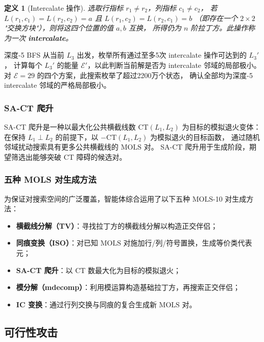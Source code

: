 \documentclass[11pt,a4paper]{ctexart}
\newtheorem{definition}[theorem]{定义}
\theoremstyle{remark}
\newcommand{\CT}{\mathrm{CT}}
\newcommand{\E}{\mathcal{E}}
\newcommand{\MOLS}{\mathrm{MOLS}}
\begin{document}
\begin{definition}[Intercalate 操作]
  选取行指标 $r_1 \ne r_2$，列指标 $c_1 \ne c_2$，
  若 $L(r_1,c_1) = L(r_2,c_2) = a$ 且 $L(r_1,c_2) = L(r_2,c_1) = b$
  （即存在一个 $2 \times 2$ "交换方块"），则将这四个位置的值 $a, b$ 互换，
  所得仍为 $n$ 阶拉丁方。此操作称为一次 \textbf{intercalate}。
\end{definition}

深度-5 BFS 从当前 $L_3$ 出发，枚举所有通过至多5次 intercalate 操作可达到的 $L_3'$，
计算每个 $L_3'$ 的能量 $\E'$，以此判断当前解是否为 intercalate 邻域的局部极小。
对 $\E = 29$ 的四个方案，此搜索枚举了超过2200万个状态，
确认全部均为深度-5 intercalate 邻域的严格局部极小。

\subsubsection{SA-CT 爬升}

SA-CT 爬升是一种以最大化公共横截线数 $\CT(L_1, L_2)$ 为目标的模拟退火变体：
在保持 $L_1 \perp L_2$ 的前提下，以 $-\CT(L_1, L_2)$ 为模拟退火的目标函数，
通过随机邻域扰动搜索具有更多公共横截线的 $\MOLS$ 对。
SA-CT 爬升用于生成阶段，期望筛选出能够突破 CT 障碍的候选对。

\subsubsection{五种 MOLS 对生成方法}

为保证对搜索空间的广泛覆盖，智能体综合运用了以下五种 $\MOLS$-10 对生成方法：

\begin{itemize}[leftmargin=2em]
  \item \textbf{横截线分解（TV）}：寻找拉丁方的横截线分解以构造正交伴侣；
  \item \textbf{同痕变换（ISO）}：对已知 $\MOLS$ 对施加行/列/符号置换，生成等价类代表元；
  \item \textbf{SA-CT 爬升}：以 CT 数最大化为目标的模拟退火；
  \item \textbf{模分解（mdecomp）}：利用模运算构造基础拉丁方，再搜索正交伴侣；
  \item \textbf{IC 变换}：通过行列交换与同痕的复合生成新 $\MOLS$ 对。
\end{itemize}

\subsection{可行性攻击}
\end{document}

